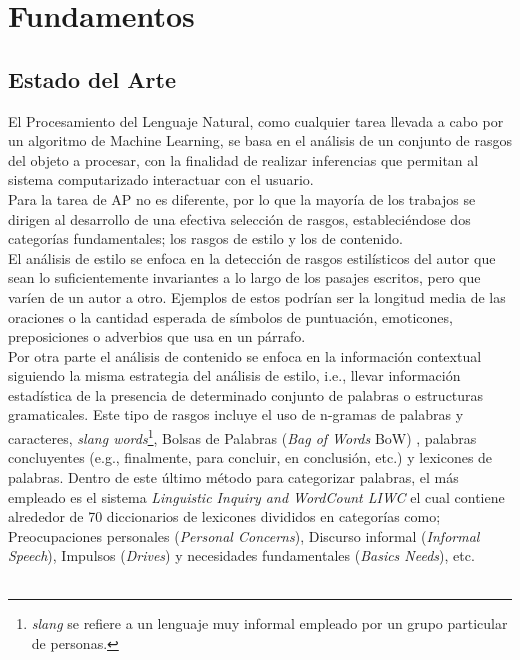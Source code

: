 
\chapter{Fundamentos}

\section{Estado del Arte}\label{SOTA}

El Procesamiento del Lenguaje Natural, como cualquier tarea llevada a cabo por un algoritmo de Machine Learning, se basa en el análisis de un conjunto de rasgos del objeto a procesar, con la finalidad de realizar inferencias que permitan al sistema computarizado interactuar con el usuario.
\\
Para la tarea de  AP no es diferente, por lo que la mayoría de los trabajos se dirigen al desarrollo de una efectiva selección de rasgos, estableciéndose dos categorías fundamentales; los rasgos de estilo y los de contenido.  
\\
El análisis de estilo se enfoca en la detección de rasgos estilísticos del autor que sean lo suficientemente invariantes a lo largo de los pasajes escritos, pero que varíen de un autor a otro. Ejemplos de estos podrían ser la longitud media de las oraciones o la cantidad esperada de símbolos de puntuación, emoticones, preposiciones o  adverbios que usa en un párrafo.
\\
Por otra parte el análisis de contenido se enfoca en la información contextual siguiendo la misma estrategia del análisis de estilo, i.e., llevar información estadística de la presencia de determinado conjunto de palabras o estructuras gramaticales. Este tipo de rasgos incluye el uso de n-gramas de palabras y caracteres, \textit{slang words}\footnote{ \textit{slang} se refiere a un lenguaje muy informal empleado por un grupo particular de personas.}, Bolsas de Palabras (\textit{Bag of Words} BoW) \citep{DBLP:conf/clef/Pizarro19,DBLP:conf/clef/Valencia-Valencia19}, palabras concluyentes (e.g., finalmente, para concluir, en conclusión, etc.)  y lexicones de palabras.
Dentro de este último método para categorizar palabras, el más empleado es el sistema \textit{Linguistic Inquiry and WordCount LIWC} \citep{pennebaker2015development} el cual contiene alrededor de 70 diccionarios de lexicones divididos en categorías como; Preocupaciones personales (\textit{Personal Concerns}), Discurso informal (\textit{Informal Speech}), Impulsos (\textit{Drives}) y necesidades fundamentales (\textit{Basics Needs}), etc.
\\\\
